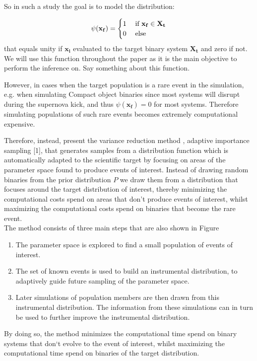 So in such a study the goal is to model the distribution:

\begin{align}
	\psi(\mathbf{x_f}  ) = \begin{cases} 1 \hspace{0.1cm} &\text{if } \mathbf{x_f} \in \mathbf{X_t} \\
	0  & \text{else}
	\end{cases}
\end{align}
that equals unity if $\mathbf{x_i}$ evaluated to the target binary system
$\mathbf{X_t}$ and zero if not. We will use this function throughout the
paper as it is the main objective to perform the inference
on.
Say something about this function.

However, in cases when the target population is a rare event in the simulation, e.g. when simulating Compact object binaries since most systems will disrupt during the supernova kick, and thus  $\psi(\mathbf{x_f}  )= 0 $ for most systems. Therefore simulating populations of such rare events becomes extremely computational expensive. 



Therefore, instead, present the variance reduction method , adaptive importance sampling [1], that generates samples
from a distribution function which is automatically adapted to the scientific target by focusing on areas
of the parameter space found to produce events of interest.
 Instead of drawing random binaries from the prior distribution $P$ we draw them from a distribution that focuses around the target distribution of interest, thereby minimizing the computational costs spend on areas that don't produce events of interest, whilst maximizing the computational costs spend on binaries that become the rare event. \\

The method consists of three main steps that are also shown in Figure 

\begin{enumerate}
	\item  The parameter space is explored to find a small population of events of interest.
	\item  The set of known events is used to build an instrumental distribution, to adaptively
guide future sampling of the parameter space.
	\item  Later simulations of population members are then drawn from this instrumental
distribution. The information from these simulations can in turn be used to
further improve the instrumental distribution.

\end{enumerate}
By doing so, the method minimizes the computational time spend on binary systems that don`t evolve to the event of interest, whilst maximizing the computational time spend on binaries of the target distribution. 




